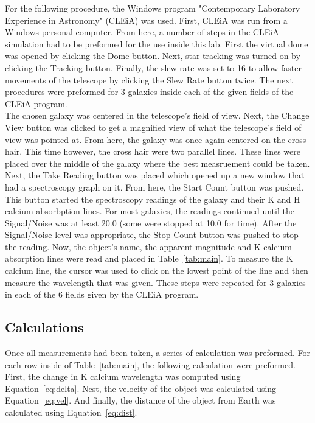 \documentclass{article}
\begin{document}
For the following procedure, the Windows program "Contemporary Laboratory Experience in
Astronomy" (CLEiA) was used. First, CLEiA was run from a Windows personal computer.
From here, a number of steps in the CLEiA simulation had to be preformed for the use
inside this lab. First the virtual dome was opened by clicking the Dome button. Next, 
star tracking was turned on by clicking the Tracking button. Finally, the slew rate
was set to 16 to allow faster movements of the telescope by clicking the Slew Rate
button twice. The next procedures were preformed for 3 galaxies inside each of the
given fields of the CLEiA program.\\

The chosen galaxy was centered in the telescope's field of view. Next, the Change View
button was clicked to get a magnified view of what the telescope's field of view was 
pointed at. From here, the galaxy was once again centered on the cross hair. This time
however, the cross hair were two parallel lines. These lines were placed over the
middle of the galaxy where the best measruement could be taken. Next, the Take Reading
button was placed which opened up a new window that had a spectroscopy graph on it.
From here, the Start Count button was pushed. This button started the spectroscopy
readings of the galaxy and their K and H calcium absorbption lines. For most galaxies,
the readings continued until the Signal/Noise was at least 20.0 (some were stopped at
10.0 for time). After the Signal/Noise level was appropriate, the Stop Count button was
pushed to stop the reading. Now, the object's name, the apparent magnitude and K
calcium absorption lines were read and placed in Table~\ref{tab:main}. To measure the
K calcium line, the cursor was used to click on the lowest point of the line and
then measure the wavelength that was given. These steps were repeated for 3 galaxies
in each of the 6 fields given by the CLEiA program.\\

\subsection{Calculations}

Once all measurements had been taken, a series of calculation was preformed. For
each row inside of Table~\ref{tab:main}, the following calculation were preformed.\\

First, the change in K calcium wavelength was computed using Equation~\ref{eq:delta}.
Nest, the velocity of the object was calculated using Equation~\ref{eq:vel}. And finally,
the distance of the object from Earth was calculated using Equation~\ref{eq:dist}.\\
\end{document}
